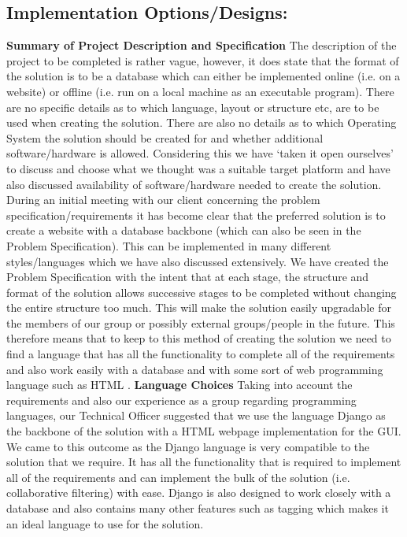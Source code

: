 \documentclass[12pt]{article}
\begin{document}
\subsection{Implementation Options/Designs: }
\vspace {5 mm}
\textbf{Summary of Project Description and Specification}
\newline
\newline
The description of the project to be completed is rather vague, however, it does state that the format of the solution is to be a database which can either be implemented online (i.e. on a website) or offline (i.e. run on a local machine as an executable program). There are no specific details as to which language, layout or structure etc, are to be used when creating the solution. There are also no details as to which Operating System the solution should be created for and whether additional software/hardware is allowed. Considering this we have ‘taken it open ourselves’ to discuss and choose what we thought was a suitable target platform and have also discussed availability of software/hardware needed to create the solution.
During an initial meeting with our client concerning the problem specification/requirements it has become clear that the preferred solution is to create a website with a database backbone (which can also be seen in the Problem Specification). This can be implemented in many different styles/languages which we have also discussed extensively. 
We have created the Problem Specification with the intent that at each stage, the structure and format of the solution allows successive stages to be completed without changing the entire structure too much. This will make the solution easily upgradable for the members of our group or possibly external groups/people in the future. This therefore means that to keep to this method of creating the solution we need to find a language that has all the functionality to complete all of the requirements and also work easily with a database and with some sort of web programming language such as HTML .
\newline
\newline
\textbf{Language Choices}
\newline
\newline
Taking into account the requirements and also our experience as a group regarding programming languages, our Technical Officer suggested that we use the language Django as the backbone of the solution with a HTML webpage implementation for the GUI. We came to this outcome as the Django language is very compatible to the solution that we require. It has all the functionality that is required to implement all of the requirements and can implement the bulk of the solution (i.e. collaborative filtering) with ease. Django is also designed to work closely with a database and also contains many other features such as tagging which makes it an ideal language to use for the solution.
\end{document}
